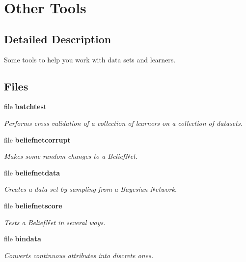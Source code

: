 \section{Other Tools}
\label{group__Tools}


\subsection{Detailed Description}
Some tools to help you work with data sets and learners. 

\subsection*{Files}
\begin{CompactItemize}
\item 
file {\bf batchtest}
\begin{CompactList}\small\item\em Performs cross validation of a collection of learners on a collection of datasets. \item\end{CompactList}

\item 
file {\bf beliefnetcorrupt}
\begin{CompactList}\small\item\em Makes some random changes to a Belief\-Net. \item\end{CompactList}

\item 
file {\bf beliefnetdata}
\begin{CompactList}\small\item\em Creates a data set by sampling from a Bayesian Network. \item\end{CompactList}

\item 
file {\bf beliefnetscore}
\begin{CompactList}\small\item\em Tests a Belief\-Net in several ways. \item\end{CompactList}

\item 
file {\bf bindata}
\begin{CompactList}\small\item\em Converts continuous attributes into discrete ones. \item\end{CompactList}


\end{CompactItemize}
